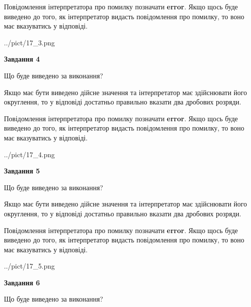 \documentclass[12pt, ukrainian]{article}
\begin{document}
{\begin {Large}
Повідомлення інтерпретатора про помилку позначати \textbf{error}.
Якщо щось буде виведено до того, як інтерпретатор видасть повідомлення про помилку, 
то воно має вказуватись у відповіді. \par

\begin{center}
	{../pict/17_3.png}
\end{center}
\newpage

{\begin {center}\textbf{Завдання 4}\end {center}}\par
Що буде виведено за виконання? \par

Якщо має бути виведено дійсне значення та інтерпретатор має здійснювати його округлення, 
то у відповіді достатньо правильно вказати два дробових розряди.

Повідомлення інтерпретатора про помилку позначати \textbf{error}.
Якщо щось буде виведено до того, як інтерпретатор видасть повідомлення про помилку, 
то воно має вказуватись у відповіді. \par

\begin{center}
	{../pict/17_4.png}
\end{center}
\newpage

{\begin {center}\textbf{Завдання 5}\end {center}}\par
Що буде виведено за виконання? \par

Якщо має бути виведено дійсне значення та інтерпретатор має здійснювати його округлення, 
то у відповіді достатньо правильно вказати два дробових розряди.

Повідомлення інтерпретатора про помилку позначати \textbf{error}.
Якщо щось буде виведено до того, як інтерпретатор видасть повідомлення про помилку, 
то воно має вказуватись у відповіді. \par

\begin{center}
	{../pict/17_5.png}
\end{center}
\newpage

{\begin {center}\textbf{Завдання 6}\end {center}}\par
Що буде виведено за виконання? \par


\end{Large}}
\end{document}
